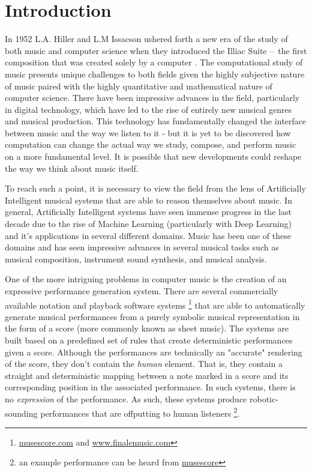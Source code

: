 \chapter{Introduction} \label{ch:introduction}

In 1952 L.A. Hiller and L.M Issacson ushered forth a new era of the study of both music and computer science when they introduced the Illiac Suite – the first composition that was created solely by a computer \cite{sandred2009revisiting}. The computational study of music presents unique challenges to both fields given the highly subjective nature of music paired with the highly quantitative and mathematical nature of computer science. There have been impressive advances in the field, particularly in digital technology, which have led to the rise of entirely new musical genres and musical production. This technology has fundamentally changed the interface between music and the way we listen to it - but it is yet to be discovered how computation can change the actual way we study, compose, and perform music on a more fundamental level. It is possible that new developments could reshape the way we think about music itself. 

To reach such a point, it is necessary to view the field from the lens of Artificially Intelligent musical systems that are able to reason themselves about music. In general, Artificially Intelligent systems have seen immense progress in the last decade due to the rise of Machine Learning (particularly with Deep Learning) and it's applications in several different domains. Music has been one of these domains and has seen impressive advances in several musical tasks such as musical composition\cite{huang2018music}, instrument sound synthesis\cite{engel2017neural}, and musical analysis\cite{widmer2016getting}. 

One of the more intriguing problems in computer music is the creation of an expressive performance generation system. There are several commercially available notation and playback software systems \footnote{\url{musescore.com} and \url{www.finalemusic.com}} that are able to automatically generate musical performances from a purely symbolic musical representation in the form of a score (more commonly known as sheet music). The systems are built based on a predefined set of rules that create deterministic performances given a score. Although the performances are technically an "accurate" rendering of the score, they don't contain the \emph{human} element. That is, they contain a straight and deterministic mapping between a note marked in a score and its corresponding position in the associated performance. In such systems, there is no \emph{expression} of the performance. As such, these systems produce robotic-sounding performances that are offputting to human listeners \footnote{an example performance can be heard from \href{https://musescore.com/user/33884420/scores/6466906}{musescore}}. 

